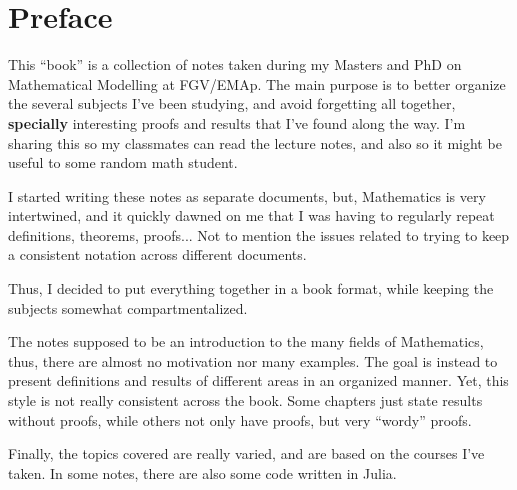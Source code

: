 \newpage
\chapter*{Preface}

This ``book'' is a collection of notes taken during my Masters and PhD on Mathematical Modelling
at FGV/EMAp. The main purpose is to better organize
the several subjects I've been studying, and avoid forgetting all together,
\textbf{specially} interesting proofs and results that I've found along the way.
I'm sharing this so my classmates can read the lecture notes, and also
so it might be useful to some random math student.

I started writing these notes as separate documents, but, Mathematics
is very intertwined, and it quickly dawned on me
that I was having to regularly repeat definitions, theorems,
proofs... Not to mention the issues related to trying to keep
a consistent notation across different documents.

Thus, I decided to put everything together in a book format,
while keeping the subjects somewhat compartmentalized.

The notes supposed to be an introduction to the many fields of Mathematics,
thus, there are almost no motivation nor many examples. The goal is instead
to present definitions and results of different areas in an organized manner.
Yet, this style is not really consistent across the book. Some chapters
just state results without proofs, while others not only have proofs,
but very ``wordy'' proofs.

Finally, the topics covered are really varied, and are based on the
courses I've taken. In some notes, there are also some code written
in Julia.

